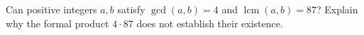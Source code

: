 Can positive integers $a,b$ satisfy $\gcd(a,b)=4$ and $\operatorname{lcm}(a,b)=87$? Explain why the formal product $4\cdot87$ does not establish their existence.
